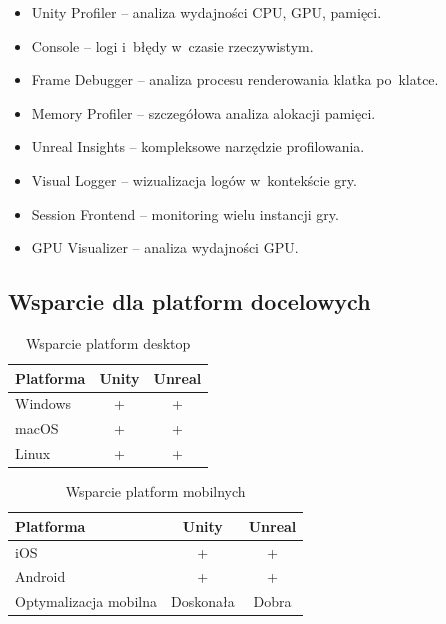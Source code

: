 \begin{itemize}
    \item Unity Profiler -- analiza wydajności CPU, GPU, pamięci.
    \item Console -- logi i~błędy w~czasie rzeczywistym.
    \item Frame Debugger -- analiza procesu renderowania klatka po~klatce.
    \item Memory Profiler -- szczegółowa analiza alokacji pamięci.
\end{itemize}

\begin{itemize}
    \item Unreal Insights -- kompleksowe narzędzie profilowania.
    \item Visual Logger -- wizualizacja logów w~kontekście gry.
    \item Session Frontend -- monitoring wielu instancji gry.
    \item GPU Visualizer -- analiza wydajności GPU.
\end{itemize}

\subsection{Wsparcie dla platform docelowych}


\begin{table}[h!]
    \centering
    \caption{Wsparcie platform desktop}
    \label{tab:platform-desktop}
    \begin{tabular}{|l|c|c|}
        \hline
        \textbf{Platforma} & \textbf{Unity} & \textbf{Unreal} \\
        \hline\hline
        Windows & + & + \\
        \hline
        macOS & + & + \\
        \hline
        Linux & + & + \\
        \hline
    \end{tabular}
\end{table}


\begin{table}[h!]
    \centering
    \caption{Wsparcie platform mobilnych}
    \label{tab:platform-mobile}
    \begin{tabular}{|l|c|c|}
        \hline
        \textbf{Platforma} & \textbf{Unity} & \textbf{Unreal} \\
        \hline\hline
        iOS & + & + \\
        \hline
        Android & + & + \\
        \hline
        Optymalizacja mobilna & Doskonała & Dobra \\
        \hline
    \end{tabular}
\end{table}


